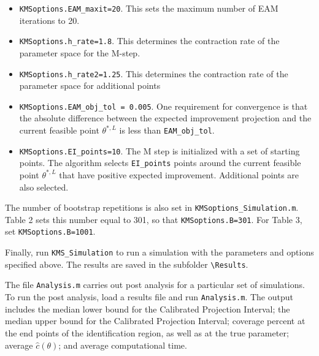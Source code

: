 \documentclass[12pt]{article}
\def\code#1{\texttt{#1}}
\begin{document}
\begin{itemize}
\item  \code{KMSoptions.EAM\_maxit=20}. This sets the maximum number of EAM iterations to 20.
\item \code{KMSoptions.h\_rate=1.8}. This determines the contraction rate of the parameter space for the M-step.
\item \code{KMSoptions.h\_rate2=1.25}.  This determines the contraction rate of the parameter space for additional points
\item \code{KMSoptions.EAM\_obj\_tol  = 0.005}.  One requirement for convergence is that the absolute difference between the expected improvement projection and the current feasible point $\theta^{*,L}$ is less than  \code{EAM\_obj\_tol}.
\item \code{KMSoptions.EI\_points=10}.  The M step is initialized with a set of starting points.  The algorithm selects \code{EI\_points} points around the current feasible point $\theta^{*,L}$ that have positive expected improvement.  Additional points are also selected.
\end{itemize}
The number of bootstrap repetitions is also set in \code{KMSoptions\_Simulation.m}.  Table 2 sets this number equal to 301, so that \code{KMSoptions.B=301}.  For Table 3, set \code{KMSoptions.B=1001}.

Finally, run \code{KMS\_Simulation} to run a simulation with the parameters and options specified above.  The results are saved in the subfolder \code{\textbackslash Results}.

The file \code{Analysis.m} carries out post analysis for a particular set of simulations.  To run the post analysis, load a results file and run \code{Analysis.m}.  The output includes the median lower bound for the Calibrated Projection Interval; the median upper bound for the Calibrated Projection Interval; coverage percent at the end points of the identification region, as well as at the true parameter; average $\hat c(\theta)$; and average computational time.
\end{document}
